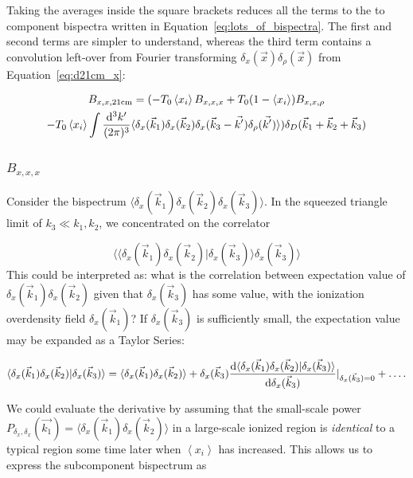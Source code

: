 Taking the averages inside the square brackets reduces all the terms to the to component bispectra written in Equation~\ref{eq:lots_of_bispectra}. The first and second terms are simpler to understand, whereas the third term contains a convolution left-over from Fourier transforming $\delta_x(\vec{x})\delta_{\rho}(\vec{x})$ from Equation~\ref{eq:d21cm_x}:

\begin{multline}
B_{x,x,{\rm 21cm}} = ( -T_0 \left\langle x_i \right\rangle B_{x,x,x} + T_0(1-\left\langle x_i \right\rangle) B_{x,x,\rho} \\ - T_0 \left\langle x_i \right\rangle \int \frac{{\rm d^3}k'}{(2\pi)^3} 
\langle \delta_x(\vec{k}_1) \delta_x(\vec{k}_2) \delta_x(\vec{k}_3 - \vec{k'})\delta_{\rho}(\vec{k'}) \rangle )
\delta_D(\vec{k}_1+\vec{k}_2+\vec{k}_3)
\end{multline}

\subsubsection*{$B_{x,x,x}$}
\label{subsubsec:Bxxx}
Consider the bispectrum $\langle\delta_x(\vec{k}_1)\delta_x(\vec{k}_2)\delta_x(\vec{k}_3)\rangle$. In the squeezed triangle limit of $k_3 \ll k_1, k_2$, we concentrated on the correlator

\begin{equation}
\langle \langle \delta_x(\vec{k}_1)\delta_x(\vec{k}_2) | \delta_x(\vec{k}_3)\rangle \delta_x(\vec{k}_3) \rangle
\end{equation}
This could be interpreted as: what is the correlation between expectation value of\\ $\delta_x(\vec{k}_1)\delta_x(\vec{k}_2)$ given that $\delta_x(\vec{k}_3)$ has some value, with the ionization overdensity field $\delta_x(\vec{k}_1)$? If $\delta_x(\vec{k}_3)$ is sufficiently small, the expectation value may be expanded as a Taylor Series:

\begin{equation}
\langle \delta_x(\vec{k}_1)\delta_x(\vec{k}_2) | \delta_x(\vec{k}_3)\rangle =
\langle \delta_x(\vec{k}_1)\delta_x(\vec{k}_2) \rangle + 
\delta_x(\vec{k}_3) \frac{{\rm d}\langle\delta_x(\vec{k}_1)\delta_x(\vec{k}_2) | \delta_x(\vec{k}_3)\rangle}{{\rm d}\delta_x(\vec{k}_3)}|_{\delta_x(\vec{k}_3)=0} + \ldots.
\end{equation}

We could evaluate the derivative by assuming that the small-scale power $P_{\delta_x,\delta_x}(\vec{k_1}) = \langle \delta_x(\vec{k}_1)\delta_x(\vec{k}_2) \rangle$ in a large-scale ionized region is \textit{identical} to a typical region some time later when $\left\langle x_i \right\rangle$ has increased. This allows us to express the subcomponent bispectrum as 

